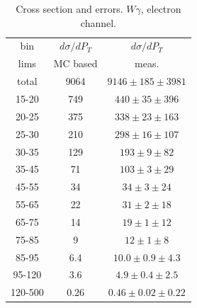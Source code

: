 \begin{table}[h]
  \scriptsize
  \begin{center}
  \caption{Cross section and errors. $W\gamma$, electron channel.}
  \begin{tabular}{|c|c|c|}
    bin & $d\sigma/dP_{T}$ &$d\sigma/dP_{T}$ \\ 
    lims & MC based &    meas.       \\ \hline
    total & 9064 & $9146 \pm 185 \pm 3981$ \\ \hline
    15-20 & 749 & $440 \pm 35 \pm 396$ \\ \hline
    20-25 & 375 & $338 \pm 23 \pm 163$ \\ \hline
    25-30 & 210 & $298 \pm 16 \pm 107$ \\ \hline
    30-35 & 129 & $193 \pm 9 \pm 82$ \\ \hline
    35-45 & 71 & $103 \pm 3 \pm 29$ \\ \hline
    45-55 & 34 & $34 \pm 3 \pm 24$ \\ \hline
    55-65 & 22 & $31 \pm 2 \pm 18$ \\ \hline
    65-75 & 14 & $19 \pm 1 \pm 12$ \\ \hline
    75-85 & 9 & $12 \pm 1 \pm 8$ \\ \hline
    85-95 & 6.4 & $10.0 \pm 0.9 \pm 4.3$ \\ \hline
    95-120 & 3.6 & $4.9 \pm 0.4 \pm 2.5$ \\ \hline
    120-500 & 0.26 & $0.46 \pm 0.02 \pm 0.22$ \\ \hline
  \end{tabular}
  \label{tab:sc_mc_vs_meas_ELECTRON_WGamma}
  \end{center}
\end{table}

